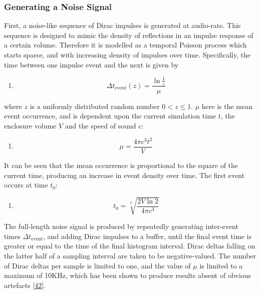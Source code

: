 \documentclass[]{scrreprt}
\providecommand{\tightlist}{%
  \setlength{\itemsep}{0pt}\setlength{\parskip}{0pt}}
\begin{document}
\subsubsection{Generating a Noise
Signal}\label{generating-a-noise-signal}

First, a noise-like sequence of Dirac impulses is generated at
audio-rate. This sequence is designed to mimic the density of
reflections in an impulse response of a certain volume. Therefore it is
modelled as a temporal Poisson process which starts sparse, and with
increasing density of impulses over time. Specifically, the time between
one impulse event and the next is given by

\begin{enumerate}
\def\labelenumi{(\arabic{enumi})}
\setcounter{enumi}{9}
\tightlist
\item
  \[\Delta t_\text{event}(z) = \frac{\ln\frac{1}{z}}{\mu}\]
\end{enumerate}

where \(z\) is a uniformly distributed random number \(0 < z \leq 1\).
\(\mu\) here is the mean event occurrence, and is dependent upon the
current simulation time \(t\), the enclosure volume \(V\) and the speed
of sound \(c\):

\begin{enumerate}
\def\labelenumi{(\arabic{enumi})}
\setcounter{enumi}{10}
\tightlist
\item
  \[\mu = \frac{4\pi c^3 t^2}{V}\]
\end{enumerate}

It can be seen that the mean occurrence is proportional to the square of
the current time, producing an increase in event density over time. The
first event occurs at time \(t_0\):

\begin{enumerate}
\def\labelenumi{(\arabic{enumi})}
\setcounter{enumi}{11}
\tightlist
\item
  \[t_0=\sqrt[3]{\frac{2V\ln 2}{4\pi c^3}}\]
\end{enumerate}

The full-length noise signal is produced by repeatedly generating
inter-event times \(\Delta t_\text{event}\), and adding Dirac impulses
to a buffer, until the final event time is greater or equal to the time
of the final histogram interval. Dirac deltas falling on the latter half
of a sampling interval are taken to be negative-valued. The number of
Dirac deltas per sample is limited to one, and the value of \(\mu\) is
limited to a maximum of 10KHz, which has been shown to produce results
absent of obvious artefacts
{[}\protect\hyperlink{ref-heinzux5fbinauralux5f1993}{42}{]}.
\end{document}
